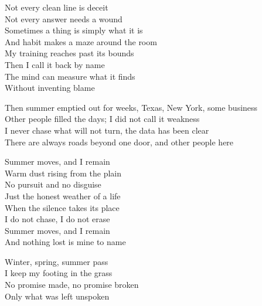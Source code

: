 \begin{lyrics}
Not every clean line is deceit\\
Not every answer needs a wound\\
Sometimes a thing is simply what it is\\
And habit makes a maze around the room\\
My training reaches past its bounds\\
Then I call it back by name\\
The mind can measure what it finds\\
Without inventing blame

Then summer emptied out for weeks, Texas, New York, some business\\
Other people filled the days; I did not call it weakness\\
I never chase what will not turn, the data has been clear\\
There are always roads beyond one door, and other people here

Summer moves, and I remain\\
Warm dust rising from the plain\\
No pursuit and no disguise\\
Just the honest weather of a life\\
When the silence takes its place\\
I do not chase, I do not erase\\
Summer moves, and I remain\\
And nothing lost is mine to name

Winter, spring, summer pass\\
I keep my footing in the grass\\
No promise made, no promise broken\\
Only what was left unspoken
\end{lyrics}

